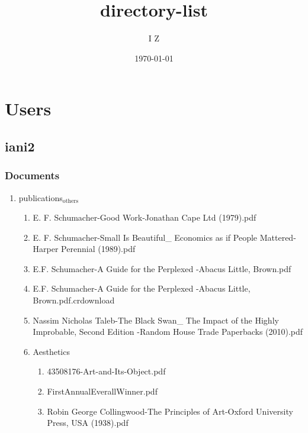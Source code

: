 \documentclass[11pt]{article}
\author{I Z}
\date{\today}
\title{directory-list}
\begin{document}
\maketitle
\tableofcontents

\section{Users}
\label{sec-1}
\subsection{iani2}
\label{sec-1-1}
\subsubsection{Documents}
\label{sec-1-1-1}
\begin{enumerate}
\item publications$_{\text{others}}$
\label{sec-1-1-1-1}
\begin{enumerate}
\item E. F. Schumacher-Good Work-Jonathan Cape Ltd (1979).pdf
\label{sec-1-1-1-1-1}

\item E. F. Schumacher-Small Is Beautiful\_ Economics as if People Mattered-Harper Perennial (1989).pdf
\label{sec-1-1-1-1-2}

\item E.F. Schumacher-A Guide for the Perplexed  -Abacus Little, Brown.pdf
\label{sec-1-1-1-1-3}

\item E.F. Schumacher-A Guide for the Perplexed  -Abacus Little, Brown.pdf.crdownload
\label{sec-1-1-1-1-4}

\item Nassim Nicholas Taleb-The Black Swan\_ The Impact of the Highly Improbable, Second Edition  -Random House Trade Paperbacks (2010).pdf
\label{sec-1-1-1-1-5}

\item Aesthetics
\label{sec-1-1-1-1-6}
\begin{enumerate}
\item 43508176-Art-and-Its-Object.pdf
\label{sec-1-1-1-1-6-1}

\item FirstAnnualEverallWinner.pdf
\label{sec-1-1-1-1-6-2}

\item Robin George Collingwood-The Principles of Art-Oxford University Press, USA (1938).pdf
\label{sec-1-1-1-1-6-3}


\end{enumerate}
\end{enumerate}
\end{enumerate}
\end{document}
